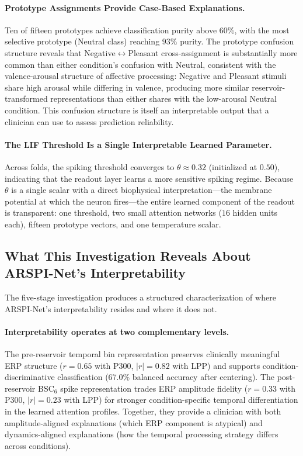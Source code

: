 \paragraph{Prototype Assignments Provide Case-Based Explanations.} Ten of fifteen prototypes achieve classification purity above $60\%$, with the most selective prototype (Neutral class) reaching $93\%$ purity. The prototype confusion structure reveals that Negative$\leftrightarrow$Pleasant cross-assignment is substantially more common than either condition's confusion with Neutral, consistent with the valence-arousal structure of affective processing: Negative and Pleasant stimuli share high arousal while differing in valence, producing more similar reservoir-transformed representations than either shares with the low-arousal Neutral condition. This confusion structure is itself an interpretable output that a clinician can use to assess prediction reliability.

\paragraph{The LIF Threshold Is a Single Interpretable Learned Parameter.} Across folds, the spiking threshold converges to $\theta \approx 0.32$ (initialized at $0.50$), indicating that the readout layer learns a more sensitive spiking regime. Because $\theta$ is a single scalar with a direct biophysical interpretation---the membrane potential at which the neuron fires---the entire learned component of the readout is transparent: one threshold, two small attention networks ($16$ hidden units each), fifteen prototype vectors, and one temperature scalar.

\subsection{What This Investigation Reveals About ARSPI-Net's Interpretability}
\label{sec:interp_synthesis}

The five-stage investigation produces a structured characterization of where ARSPI-Net's interpretability resides and where it does not.

\paragraph{Interpretability operates at two complementary levels.} The pre-reservoir temporal bin representation preserves clinically meaningful ERP structure ($r = 0.65$ with P300, $|r| = 0.82$ with LPP) and supports condition-discriminative classification ($67.0\%$ balanced accuracy after centering). The post-reservoir BSC$_6$ spike representation trades ERP amplitude fidelity ($r = 0.33$ with P300, $|r| = 0.23$ with LPP) for stronger condition-specific temporal differentiation in the learned attention profiles. Together, they provide a clinician with both amplitude-aligned explanations (which ERP component is atypical) and dynamics-aligned explanations (how the temporal processing strategy differs across conditions).


